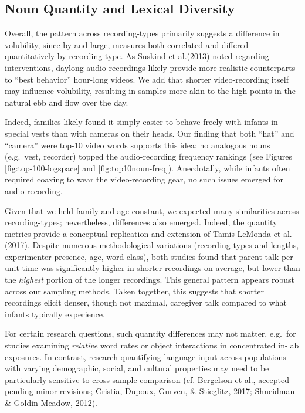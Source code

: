 \documentclass[man]{apa6}
\theoremstyle{definition}
\theoremstyle{definition}
\theoremstyle{definition}
\theoremstyle{remark}
\begin{document}
\subsection{Noun Quantity and Lexical
Diversity}\label{noun-quantity-and-lexical-diversity}

Overall, the pattern across recording-types primarily suggests a
difference in volubility, since by-and-large, measures both correlated
and differed quantitatively by recording-type. As Suskind et al.(2013)
noted regarding interventions, daylong audio-recordings likely provide
more realistic counterparts to \enquote{best behavior} hour-long videos.
We add that shorter video-recording itself may influence volubility,
resulting in samples more akin to the high points in the natural ebb and
flow over the day.

Indeed, families likely found it simply easier to behave freely with
infants in special vests than with cameras on their heads. Our finding
that both \enquote{hat} and \enquote{camera} were top-10 video words
supports this idea; no analogous nouns (e.g.~vest, recorder) topped the
audio-recording frequency rankings (see Figures
\ref{fig:top-100-logspace} and \ref{fig:top10noun-freq}). Anecdotally,
while infants often required coaxing to wear the video-recording gear,
no such issues emerged for audio-recording.

Given that we held family and age constant, we expected many
similarities across recording-types; nevertheless, differences also
emerged. Indeed, the quantity metrics provide a conceptual replication
and extension of Tamis-LeMonda et al. (2017). Despite numerous
methodological variations (recording types and lengths, experimenter
presence, age, word-class), both studies found that parent talk per unit
time was significantly higher in shorter recordings on average, but
lower than the \emph{highest} portion of the longer recordings. This
general pattern appears robust across our sampling methods. Taken
together, this suggests that shorter recordings elicit denser, though
not maximal, caregiver talk compared to what infants typically
experience.

For certain research questions, such quantity differences may not
matter, e.g.~for studies examining \emph{relative} word rates or object
interactions in concentrated in-lab exposures. In contrast, research
quantifying language input across populations with varying demographic,
social, and cultural properties may need to be particularly sensitive to
cross-sample comparison (cf. Bergelson et al., accepted pending minor
revisions; Cristia, Dupoux, Gurven, \& Stieglitz, 2017; Shneidman \&
Goldin-Meadow, 2012).
\end{document}
